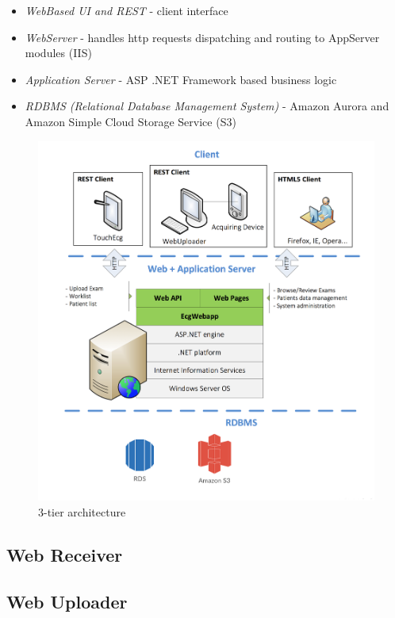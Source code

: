 \begin{itemize}
    \item \textit{WebBased UI and REST} - client interface
    \item \textit{WebServer} - handles http requests dispatching and routing to AppServer modules (IIS)
    \item \textit{Application Server} - ASP .NET Framework based business logic
    \item \textit{RDBMS (Relational Database Management System)} - Amazon Aurora and Amazon Simple Cloud Storage Service (S3)
\end{itemize}
\begin{figure}
    \includegraphics[width=\textwidth]{img/tiers_diagram}
    \caption{3-tier architecture}
    \label{fig:tiers_diagram}
\end{figure}

\subsection{Web Receiver}
\label{subsection:webreceiver}
\subsection{Web Uploader}
